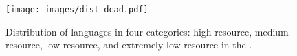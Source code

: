 \begin{figure}[!htb]
    \centering
    \texttt{[image: images/dist\_dcad.pdf]}
    \caption{\label{fig:four_categories}
    Distribution of languages in four categories: high-resource, medium-resource, low-resource, and extremely low-resource in the \dcad.
    }
\end{figure}

